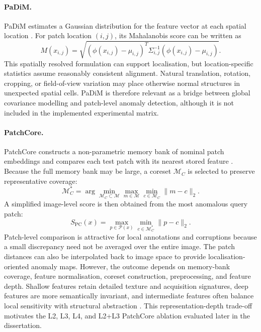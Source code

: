 \documentclass[fleqn,12pt]{olplainarticle}
\begin{document}
\paragraph{PaDiM.}
PaDiM estimates a Gaussian distribution for the feature vector at each spatial location \cite{defard2021padim}. For patch location $(i,j)$, its Mahalanobis score can be written as
\begin{equation}
    M(x_{i,j})=
    \sqrt{\left(\phi(x_{i,j})-\mu_{i,j}\right)^T
    \Sigma_{i,j}^{-1}
    \left(\phi(x_{i,j})-\mu_{i,j}\right)}.
\end{equation}
This spatially resolved formulation can support localisation, but location-specific statistics assume reasonably consistent alignment. Natural translation, rotation, cropping, or field-of-view variation may place otherwise normal structures in unexpected spatial cells. PaDiM is therefore relevant as a bridge between global covariance modelling and patch-level anomaly detection, although it is not included in the implemented experimental matrix.

\paragraph{PatchCore.}
PatchCore constructs a non-parametric memory bank of nominal patch embeddings and compares each test patch with its nearest stored feature \cite{roth2022towards}. Because the full memory bank may be large, a coreset $\mathcal{M}_C$ is selected to preserve representative coverage:
\begin{equation}
    \mathcal{M}_C^{*}=
    \arg\min_{\mathcal{M}_C\subset\mathcal{M}}
    \max_{m\in\mathcal{M}}
    \min_{c\in\mathcal{M}_C}
    \lVert m-c\rVert_2.
\end{equation}
A simplified image-level score is then obtained from the most anomalous query patch:
\begin{equation}
    S_{\mathrm{PC}}(x)=
    \max_{p\in\mathcal{P}(x)}
    \min_{c\in\mathcal{M}_C^{*}}
    \lVert p-c\rVert_2.
    \label{eq:patchcore_score}
\end{equation}
Patch-level comparison is attractive for local annotations and corruptions because a small discrepancy need not be averaged over the entire image. The patch distances can also be interpolated back to image space to provide localisation-oriented anomaly maps. However, the outcome depends on memory-bank coverage, feature normalisation, coreset construction, preprocessing, and feature depth. Shallow features retain detailed texture and acquisition signatures, deep features are more semantically invariant, and intermediate features often balance local sensitivity with structural abstraction \cite{yosinski2014transferable,zeiler2014visualizing}. This representation-depth trade-off motivates the L2, L3, L4, and L2+L3 PatchCore ablation evaluated later in the dissertation.
\end{document}
